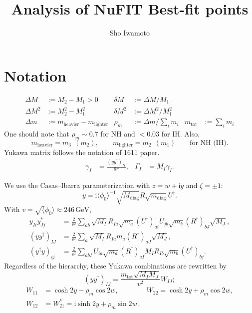\documentclass[a4paper,11pt]{scrartcl}
\author{Sho Iwamoto}
\title{Analysis of NuFIT Best-fit points}
\numberwithin{equation}{section}
\newcommand\w[1]{_{\mathrm{#1}}}
\newcommand\ii{\mathrm{i}}
\newcommand\vev[1]{\langle#1\rangle}
\newcommand\unit[1]{\,\mathrm{#1}\xspace}
\newcommand\GeV{\unit{GeV}}
\newcommand\mtot{m_{\mathrm{tot}}}
\newcommand\yydag{(yy^\dagger)}
\begin{document}
\begin{center}{\makeatletter
{\huge{}\@title}\par\vspace{2em}
{\Large \@author}\par\vspace{2em}
}
\end{center}

\section{Notation}
\begin{align*}
 \Delta M & := M_2-M_1 > 0 &
 \delta M & := \Delta M/M_1\\
 \Delta M^2 & := M_2^2-M_1^2 &
 \delta M^2 & := \Delta M^2 / M_1^2 \\
 \Delta m & := m\w{heavier} - m\w{lighter}&
 \rho_m   & := \Delta m/\sum_i m_i &
 \mtot    & := \sum_i m_i
\end{align*}
One should note that $\rho_m\sim 0.7$ for NH and $<0.03$ for IH.
Also,
\begin{equation*}
 m\w{heavier} = m_3 \ \ (m_2),\qquad
 m\w{lighter} = m_2 \ \ (m_1)\qquad\text{for NH (IH).}
\end{equation*}
Yukawa matrix follows the notation of 1611 paper.
\begin{align*}
 \gamma_I &= \frac{(yy^\dagger)_{II}}{8\pi},
&
 \Gamma_I &= M_I\gamma_I.
\end{align*}

We use the Casas--Ibarra parameterization with $z=w+\ii y$ and $\zeta=\pm1$:
\begin{equation}
 y = \ii\vev{\phi_0}^{-1}\sqrt{M\w{diag}}R\sqrt{m\w{diag}}U^\dagger.
\end{equation}
With $v=\sqrt\vev{\phi_0}\approx246\GeV$,
\begin{align}
 y_{Ii}y^*_{Jj} &= \frac{2}{v^2}\sum_{ab}
\sqrt{M_I}R_{Ia}\sqrt{m_a}(U^\dagger)_{ai}
U_{jb}\sqrt{m_b}(R^\dagger)_{bJ}\sqrt{M_J},
\\
 (yy^\dagger)_{IJ} &= \frac{2}{v^2}\sum_{a}
\sqrt{M_I}R_{Ia}{m_a}(R^\dagger)_{aJ}\sqrt{M_J},\\
 (y^\dagger y)_{ij} &= \frac{2}{v^2}\sum_{abI}
U_{ia}\sqrt{m_a}(R^\dagger)_{aI}
M_I R_{Ib}\sqrt{m_b}(U^\dagger)_{bj}.
\end{align}
Regardless of the hierarchy, these Yukawa combinations are rewritten by
\begin{equation}
 \yydag_{IJ} = \frac{\mtot\sqrt{M_IM_J}}{v^2}W_{IJ};
\end{equation}
\begin{align}
 W_{11} &= \cosh2y - \rho_m\cos2w, \qquad\qquad
 W_{22} = \cosh2y + \rho_m\cos2w,\\
 W_{12} &= W_{21}^* = \ii\sinh2y + \rho_m\sin2w.
\end{align}
\end{document}

